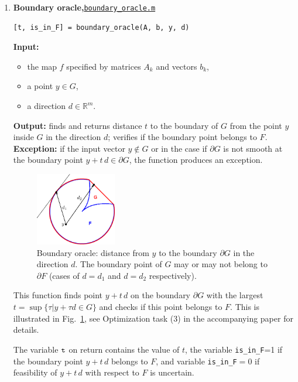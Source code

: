 \documentclass[a4paper]{article}
\newcommand{\R}{\mathbb{R}}
\theoremstyle{definition}
\begin{document}
\begin{enumerate}
The function returns {\tt is\_infeasible}=1 if the desired hyperplane was found.
In this case $y\notin G$ and consequently $y\notin F$, implying there is no $x\in \mathbb{V}$ such that $y=f(x)$, i.e.~this point is infeasible.
If the hyperplane was not found the function returns {\tt is\_infeasible}$=0$, which means $y$ does belong to $G$ but the feasibility  of $y$ with respect to $F$ is uncertain.
\newpage
\item {\bf Boundary oracle,\hskip 6pt}\underline{\tt boundary\_oracle.m}
\begin{verbatim}
[t, is_in_F] = boundary_oracle(A, b, y, d)
\end{verbatim}
{\bf Input:}
\begin{itemize}
	\item the map $f$ specified by matrices $A_k$ and vectors $b_k$,
	\item a point $y\in G$,
	\item a direction $d\in\R^m$.
\end{itemize}
{\bf Output:}  finds and returns distance $t$ to the boundary of $G$ from the point $y$ inside $G$ in the direction $d$; verifies if the boundary point belongs to $F$.\\
{\bf Exception:}  if the input vector $y\notin G$ or in the case if $\partial G$ is not smooth at the boundary point $y+t\,d\in \partial G$, the function produces an exception.


\begin{figure}[H]
	\centering\includegraphics[width=100pt]{fig/boundary_oracle}
	\caption{Boundary oracle: distance from $y$ to the boundary $\partial G$ in the direction $d$.
	The boundary point of $G$ may or may not belong to $\partial F$ (cases of $d=d_1$ and $d=d_2$ respectively).}
\label{fig:two}
\end{figure}


This function finds point $y+t\,d$ on the boundary $\partial G$ with the largest $ {t} = \sup\{\tau\big| y+\tau d\in G\}$ and checks if this point belongs to $F$. 
This is illustrated in Fig.~\ref{fig:two}, see Optimization task (3) in the accompanying paper for details.

The variable $\tt t$ on return contains the value of $t$, the variable {\tt  is\_in\_F}=1 if the boundary point $y+t\,d$ belongs to $F$, and variable {\tt  is\_in\_F}$=0$ if feasibility of $y+t\,d$ with respect to $F$ is uncertain.


\end{enumerate}
\end{document}

